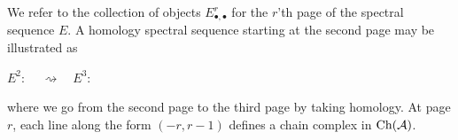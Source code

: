 \documentclass[../thesis.tex]{subfiles}
\begin{document}
        We refer to the collection of objects $E^r_{\bullet,\bullet}$ for the $r$'th page of the spectral sequence $E$. A homology spectral sequence starting at the second page may be illustrated as
        \begin{center}
            $E^2$: 
            $\quad \rightsquigarrow\quad E^3$: 
        \end{center}
        where we go from the second page to the third page by taking homology. At page $r$, each line along the form $(-r, r-1)$ defines a chain complex in $\tt{Ch}(\mathcal{A})$.
\end{document}

